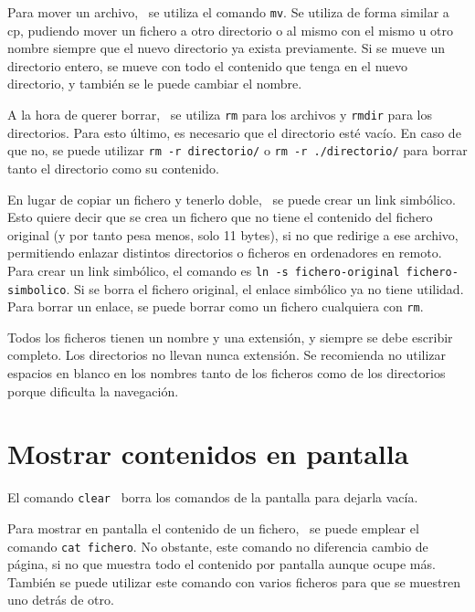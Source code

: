 Para mover un archivo, \marginpar[\footnotesize mv] \ se utiliza el comando \texttt{mv}. Se utiliza de forma similar a cp, pudiendo mover un fichero a otro directorio o al mismo con el mismo u otro nombre siempre que el nuevo directorio ya exista previamente. Si se mueve un directorio entero, se mueve con todo el contenido que tenga en el nuevo directorio, y también se le puede cambiar el nombre. 

A la hora de querer borrar,  \ se utiliza \texttt{rm} para los archivos y \texttt{rmdir} para los directorios. Para esto último, es necesario que el directorio esté vacío. En caso de que no, se puede utilizar \texttt{rm -r directorio/} o \texttt{rm -r ./directorio/} para borrar tanto el directorio como su contenido.

En lugar de copiar un fichero y tenerlo doble, \marginpar[\footnotesize ln] \ se puede crear un link simbólico. Esto quiere decir que se crea un fichero que no tiene el contenido del fichero original (y por tanto pesa menos, solo 11 bytes), si no que redirige a ese archivo, permitiendo enlazar distintos directorios o ficheros en ordenadores en remoto. Para crear un link simbólico, el comando es \texttt{ln -s fichero-original fichero-simbolico}. Si se borra el fichero original, el enlace simbólico ya no tiene utilidad. Para borrar un enlace, se puede borrar como un fichero cualquiera con \texttt{rm}.

\begin{table}[htbp]
\begin{mdframed}[backgroundcolor=black!10]
    \centering
    Todos los ficheros tienen un nombre y una extensión, y siempre se debe escribir completo. Los directorios no llevan nunca extensión. Se recomienda no utilizar espacios en blanco en los nombres tanto de los ficheros como de los directorios porque dificulta la navegación.
    \end{mdframed}
\end{table}

\section{Mostrar contenidos en pantalla}
El comando \texttt{clear}  \ borra los comandos de la pantalla para dejarla vacía.

Para mostrar en pantalla el contenido de un fichero,  \ se puede emplear el comando \texttt{cat fichero}. No obstante, este comando no diferencia cambio de página, si no que muestra todo el contenido por pantalla aunque ocupe más. También se puede utilizar este comando con varios ficheros para que se muestren uno detrás de otro. 

